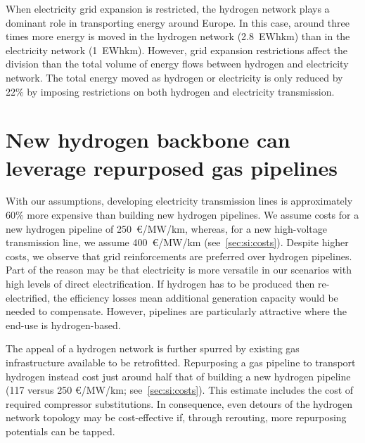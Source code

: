 When electricity grid expansion is restricted, the hydrogen network plays a
dominant role in transporting energy around Europe. In this case, around three
times more energy is moved in the hydrogen network (2.8~EWhkm) than in the
electricity network (1~EWhkm). However, grid expansion restrictions affect the
division than the total volume of energy flows between hydrogen and electricity
network. The total energy moved as hydrogen or electricity is only reduced by
22\% by imposing restrictions on both hydrogen and electricity transmission.

\section*{New hydrogen backbone can leverage repurposed gas pipelines}
\label{sec:repurposed}

With our assumptions, developing electricity transmission lines is approximately
60\% more expensive than building new hydrogen pipelines. We assume costs for a
new hydrogen pipeline of 250~\euro/MW/km, whereas, for a new
high-voltage transmission line, we assume 400~\euro/MW/km (see~\cref{sec:si:costs}). Despite
higher costs, we observe that grid reinforcements are preferred over hydrogen
pipelines. Part of the reason may be that electricity is more versatile in our
scenarios with high levels of direct electrification. If hydrogen has to be
produced then re-electrified, the efficiency losses mean additional generation
capacity would be needed to compensate. However, pipelines are particularly
attractive where the end-use is hydrogen-based.

The appeal of a hydrogen network is further spurred by existing gas
infrastructure available to be retrofitted. Repurposing a gas pipeline to
transport hydrogen instead cost just around half that of building a new
hydrogen pipeline (117 versus 250 \euro/MW/km; see~\cref{sec:si:costs}). This estimate includes
the cost of required compressor substitutions. In consequence, even detours of
the hydrogen network topology may be cost-effective if, through rerouting, more
repurposing potentials can be tapped.

